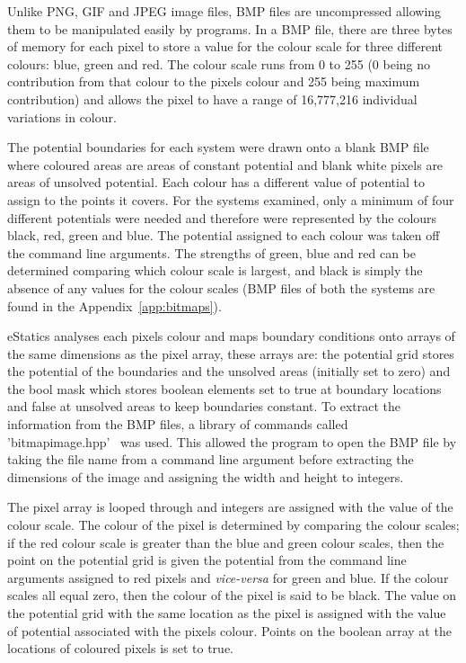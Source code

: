 Unlike PNG, GIF and JPEG image files, BMP files are uncompressed allowing them to be manipulated easily by programs. In a BMP file, there are three bytes of memory for each pixel to store a value for the colour scale for three different colours: blue, green and red. The colour scale runs from 0 to 255 (0 being no contribution from that colour to the pixels colour and 255 being maximum contribution) and allows the pixel to have a range of 16,777,216 individual variations in colour.

The potential boundaries for each system were drawn onto a blank BMP file where coloured areas are areas of constant potential and blank white pixels are areas of unsolved potential. Each colour has a different value of potential to assign to the points it covers. For the systems examined, only a minimum of four different potentials were needed and therefore were represented by the colours black, red, green and blue. The potential assigned to each colour was taken off the command line arguments. The strengths of green, blue and red can be determined comparing which colour scale is largest, and black is simply the absence of any values for the colour scales (BMP files of both the systems are found in the Appendix~\ref{app:bitmaps}).

eStatics analyses each pixels colour and maps boundary conditions onto arrays of the same dimensions as the pixel array, these arrays are: the potential grid stores the potential of the boundaries and the unsolved areas (initially set to zero) and the bool mask which stores boolean elements set to true at boundary locations and false at unsolved areas to keep boundaries constant. To extract the information from the BMP files, a library of commands called 'bitmap\textunderscore image.hpp'~\cite{arash} was used. This allowed the program to open the BMP file  by taking the file name from a command line argument before extracting the dimensions of the image and assigning the width and height to integers.

The pixel array is looped through and integers are assigned with the value of the colour scale. The colour of the pixel is determined by comparing the colour scales; if the red colour scale is greater than the blue and green colour scales, then the point on the potential grid is given the potential from the command line arguments assigned to red pixels and \emph{vice-versa} for green and blue. If the colour scales all equal zero, then the colour of the pixel is said to be black. The value on the potential grid with the same location as the pixel is assigned with the value of potential associated with the pixels colour. Points on the boolean array at the locations of coloured pixels is set to true.
